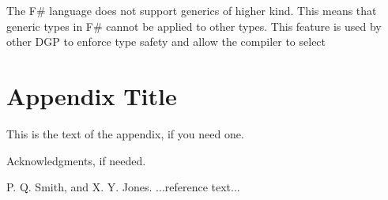\documentclass{sigplanconf}
\begin{document}
The F\# language does not support generics of higher kind. This means that generic types in F\# cannot be applied to other types. This feature is used by other DGP \cite{Regular,MultiRec,GenericDeriving,RepLib} to enforce type safety and allow the compiler to select  

\appendix
\section{Appendix Title}

This is the text of the appendix, if you need one.

\acks

Acknowledgments, if needed.





\begin{thebibliography}{}
\softraggedright

P. Q. Smith, and X. Y. Jones. ...reference text...

\end{thebibliography}
\end{document}

